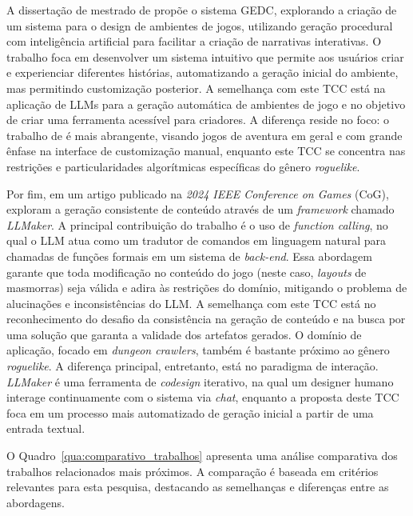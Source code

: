 A dissertação de mestrado de  propõe o sistema
\gls{GEDC}, explorando a criação de um sistema para o design de ambientes de
jogos, utilizando geração procedural com inteligência artificial para facilitar
a criação de narrativas interativas. O trabalho foca em desenvolver um sistema
intuitivo que permite aos usuários criar e experienciar diferentes histórias,
automatizando a geração inicial do ambiente, mas permitindo customização
posterior. A semelhança com este TCC está na aplicação de \gls{LLM}s para a
geração automática de ambientes de jogo e no objetivo de criar uma ferramenta
acessível para criadores. A diferença reside no foco: o trabalho de
 é mais abrangente, visando jogos de aventura em
geral e com grande ênfase na interface de customização manual, enquanto este TCC
se concentra nas restrições e particularidades algorítmicas específicas do
gênero \textit{roguelike}.

Por fim, em um artigo publicado na \textit{2024 IEEE Conference on Games} (CoG),
 exploram a geração consistente de
conteúdo através de um \textit{framework} chamado \textit{LLMaker}. A principal
contribuição do trabalho é o uso de \textit{function calling}, no qual o \gls{LLM}
atua como um tradutor de comandos em linguagem natural para chamadas de funções
formais em um sistema de \textit{back-end}. Essa abordagem garante que toda
modificação no conteúdo do jogo (neste caso, \textit{layouts} de masmorras) seja
válida e adira às restrições do domínio, mitigando o problema de alucinações e
inconsistências do \gls{LLM}. A semelhança com este TCC está no reconhecimento
do desafio da consistência na geração de conteúdo e na busca por uma solução que
garanta a validade dos artefatos gerados. O domínio de aplicação, focado em
\textit{dungeon crawlers}, também é bastante próximo ao gênero
\textit{roguelike}. A diferença principal, entretanto, está no paradigma de
interação. \textit{LLMaker} é uma ferramenta de \textit{codesign} iterativo, na qual um
designer humano interage continuamente com o sistema via \textit{chat}, enquanto a
proposta deste TCC foca em um processo mais automatizado de geração inicial a
partir de uma entrada textual.

O Quadro~\ref{qua:comparativo_trabalhos} apresenta uma análise comparativa dos
trabalhos relacionados mais próximos. A comparação é baseada em critérios
relevantes para esta pesquisa, destacando as semelhanças e diferenças entre as
abordagens.

